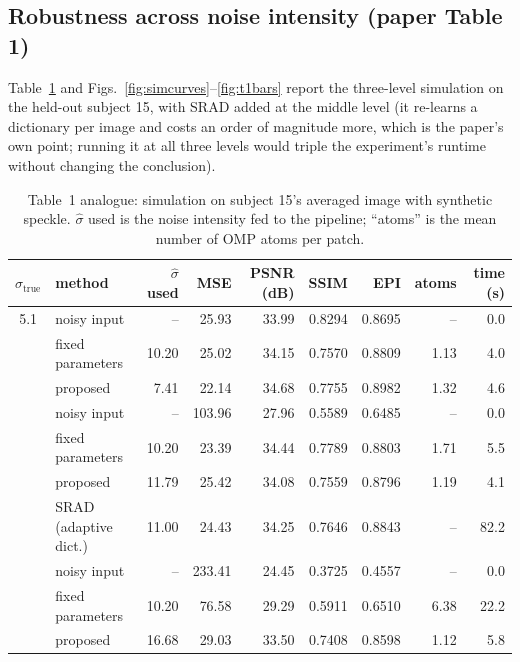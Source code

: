 \documentclass[11pt,a4paper]{article}
\newcommand{\sh}{\hat{\sigma}}
\begin{document}
\subsection{Robustness across noise intensity (paper Table 1)}\label{sec:sim}

Table~\ref{tab:t1} and Figs.~\ref{fig:simcurves}--\ref{fig:t1bars} report the three-level simulation on the held-out
subject 15, with SRAD added at the middle level (it re-learns a dictionary per image and costs an order of magnitude
more, which is the paper's own point; running it at all three levels would triple the experiment's runtime without
changing the conclusion).

\begin{table}[H]
\centering
\caption{Table~1 analogue: simulation on subject 15's averaged image with synthetic speckle. $\sh$ used is the
noise intensity fed to the pipeline; ``atoms'' is the mean number of OMP atoms per patch.}
\label{tab:t1}
\footnotesize
\setlength{\tabcolsep}{4.6pt}
\begin{tabular}{@{}c l r rrrr r r@{}}
\toprule
$\sigma_{\text{true}}$ & method & $\sh$ used & MSE & PSNR (dB) & SSIM & EPI & atoms & time (s)\\
\midrule
5.1 & noisy input & -- &  25.93 & 33.99 & 0.8294 & 0.8695 & -- &   0.0 \\
 & fixed parameters & 10.20 &  25.02 & 34.15 & 0.7570 & 0.8809 & 1.13 &   4.0 \\
 & proposed & 7.41 &  22.14 & 34.68 & 0.7755 & 0.8982 & 1.32 &   4.6 \\
\addlinespace[2pt]
10.2 & noisy input & -- & 103.96 & 27.96 & 0.5589 & 0.6485 & -- &   0.0 \\
 & fixed parameters & 10.20 &  23.39 & 34.44 & 0.7789 & 0.8803 & 1.71 &   5.5 \\
 & proposed & 11.79 &  25.42 & 34.08 & 0.7559 & 0.8796 & 1.19 &   4.1 \\
 & SRAD (adaptive dict.) & 11.00 &  24.43 & 34.25 & 0.7646 & 0.8843 & -- &  82.2 \\
\addlinespace[2pt]
15.3 & noisy input & -- & 233.41 & 24.45 & 0.3725 & 0.4557 & -- &   0.0 \\
 & fixed parameters & 10.20 &  76.58 & 29.29 & 0.5911 & 0.6510 & 6.38 &  22.2 \\
 & proposed & 16.68 &  29.03 & 33.50 & 0.7408 & 0.8598 & 1.12 &   5.8 \\
\bottomrule
\end{tabular}
\end{table}
\end{document}
